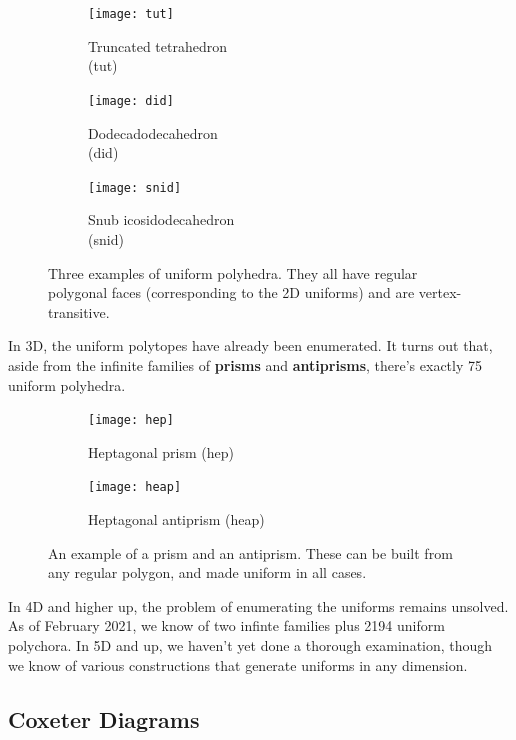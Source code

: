 \documentclass{article}
\begin{document}
\begin{figure}[H]
\centering
\begin{subfigure}{.33333\textwidth}
  \centering
  \texttt{[image: tut]}
  \caption{Truncated tetrahedron\\(tut)}
  \label{fig:tut}
\end{subfigure}%
\begin{subfigure}{.33333\textwidth}
  \centering
  \texttt{[image: did]}
  \caption{Dodecadodecahedron\\(did)}
  \label{fig:did}
\end{subfigure}%
\begin{subfigure}{.33333\textwidth}
  \centering
  \texttt{[image: snid]}
  \caption{Snub icosidodecahedron\\(snid)}
  \label{fig:snid}
\end{subfigure}%
\caption{Three examples of uniform polyhedra. They all have regular polygonal faces (corresponding to the 2D uniforms) and are vertex-transitive.}
\label{fig:uniforms3D}
\end{figure}

In 3D, the uniform polytopes have already been enumerated. It turns out that, aside from the infinite families of \textbf{prisms} and \textbf{antiprisms}, there's exactly 75 uniform polyhedra. %

\begin{figure}[H]
\centering
\begin{subfigure}{.5\textwidth}
  \centering
  \texttt{[image: hep]}
  \caption{Heptagonal prism (hep)}
  \label{fig:hep}
\end{subfigure}%
\begin{subfigure}{.5\textwidth}
  \centering
  \texttt{[image: heap]}
  \caption{Heptagonal antiprism (heap)}
  \label{fig:heap}
\end{subfigure}%
\caption{An example of a prism and an antiprism. These can be built from any regular polygon, and made uniform in all cases.}
\label{fig:prisms}
\end{figure}

In 4D and higher up, the problem of enumerating the uniforms remains unsolved. As of February 2021, we know of two infinte families plus 2194 uniform polychora. In 5D and up, we haven't yet done a thorough examination, though we know of various constructions that generate uniforms in any dimension.

\subsection{Coxeter Diagrams}
\end{document}
